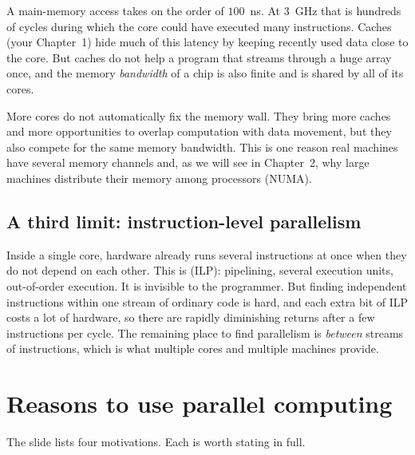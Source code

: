 A main-memory access takes on the order of $100$~ns. At $3$~GHz that is hundreds of cycles during
which the core could have executed many instructions. Caches (your Chapter~1) hide much of this
latency by keeping recently used data close to the core. But caches do not help a program that
streams through a huge array once, and the memory \emph{bandwidth} of a chip is also finite and is
shared by all of its cores.

\begin{pitfall}
More cores do not automatically fix the memory wall. They bring more caches and more
opportunities to overlap computation with data movement, but they also compete for the same memory
bandwidth. This is one reason real machines have several memory channels and, as we will see in Chapter~2,
why large machines distribute their memory among processors (NUMA).
\end{pitfall}

\subsection{A third limit: instruction-level parallelism}

Inside a single core, hardware already runs several instructions at once when they do not depend on each other.
This is  (ILP): pipelining, several execution units, out-of-order
execution. It is invisible to the programmer. But finding independent instructions within one stream of ordinary code is
hard, and each extra bit of ILP costs a lot of hardware, so there are rapidly diminishing returns after a few instructions per cycle.
The remaining place to find parallelism is \emph{between} streams of instructions, which is
what multiple cores and multiple machines provide.

\section{Reasons to use parallel computing}

The slide lists four motivations. Each is worth stating in full.


